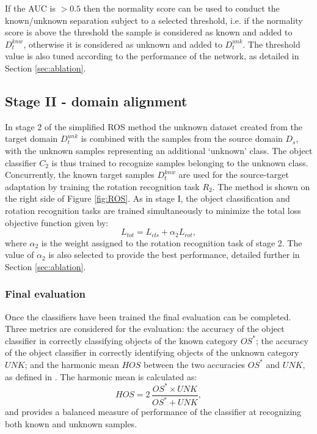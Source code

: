 \documentclass[10pt,twocolumn,letterpaper]{article}
\begin{document}
If the AUC is $> 0.5$ then the normality score can be used to conduct the known/unknown separation subject to a selected threshold, i.e. if the normality score is above the threshold the sample is considered as known and added to $D^{knw}_t$, otherwise it is considered as unknown and added to $D_t^{unk}$. The threshold value is also tuned according to the performance of the network, as detailed in Section \ref{sec:ablation}.


\subsection{Stage II - domain alignment}
\label{sec:stage2}

In stage 2 of the simplified ROS method the unknown dataset created from the target domain $D_t^{unk}$ is combined with the samples from the source domain $D_s$, with the unknown samples representing an additional `unknown' class. The object classifier $C_2$ is thus trained to recognize samples belonging to the unknown class. Concurrently, the known target samples  $D^{knw}_t$ are used for the source-target adaptation by training the rotation recognition task $R_2$. The method is shown on the right side of Figure \ref{fig:ROS}. As in stage I, the object classification and rotation recognition tasks are trained simultaneously to minimize the total loss objective function given by:
\begin{equation}
  L_{tot} = L_{cls} + \alpha_2 L_{rot} ,
  \label{eq:totalloss}
\end{equation}
where $\alpha_2$ is the weight assigned to the rotation recognition task of stage 2. The value of $\alpha_2$ is also selected to provide the best performance, detailed further in Section \ref{sec:ablation}. 


\subsubsection*{Final evaluation}

Once the classifiers have been trained the final evaluation can be completed. Three metrics are considered for the evaluation: the accuracy of the object classifier in correctly classifying objects of the known category $OS^*$; the accuracy of the object classifier in correctly identifying objects of the unknown category $UNK$; and the harmonic mean $HOS$ between the two accuracies $OS^*$ and $UNK$, as defined in \cite{Bucci2020}. The harmonic mean is calculated as:
\begin{equation}
 HOS = 2\, \frac{OS^* \times UNK}{OS^* + UNK} ,
 \label{eq:hos}
\end{equation}
and provides a balanced measure of performance of the classifier at recognizing both known and unknown samples.
\end{document}
